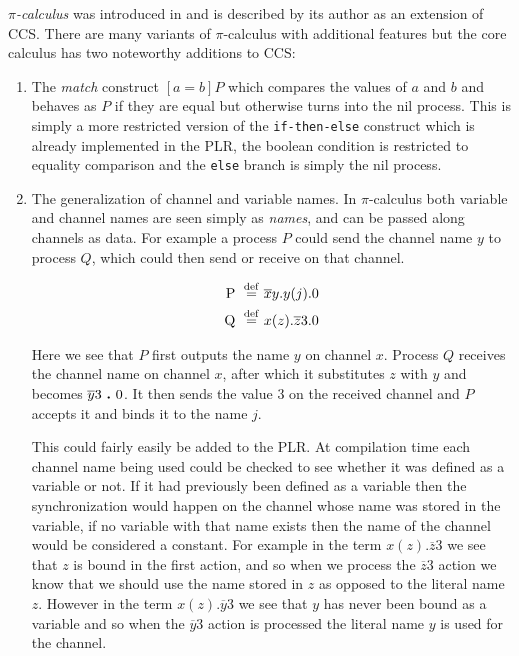 	\textit{$\pi$-calculus} was introduced in \cite{Milner89acalculus} and is 
	described by its author as an extension of CCS. There are many variants of 
	$\pi$-calculus with additional features but the core calculus has two 
	noteworthy additions to CCS:
	
	\begin{enumerate}
		\item The \textit{match} construct $[a = b] P$ which compares the values 
		of $a$ and $b$ and behaves as $P$ if they are equal but otherwise turns 
		into the nil process. This is simply a more restricted version of the 
		\texttt{if-then-else} construct which is already implemented in the PLR, 
		the 	boolean condition is restricted to equality comparison and the 
		\texttt{else} branch is simply the nil process. 
		
		\item The generalization of channel and variable names. In $\pi$-calculus 
		both variable and channel names are seen simply as \textit{names}, and can 
		be passed along channels as data. For example a process $P$ could send the 
		channel name $y$ to process $Q$, which could then send or receive on that 
		channel.
		
	  \begin{align*}
			\mathrm{P} \ \stackrel{\mathrm{def}}{=}\  & \overline{x}y . y(j) . 0\\
			\mathrm{Q} \ \stackrel{\mathrm{def}}{=}\  & x(z) . \overline{z}3 . 0\\
		\end{align*} 
		
		Here we see that $P$ first outputs the name $y$ on channel $x$. Process 
		$Q$ receives the channel name on channel $x$, after which it substitutes
		$z$ with $y$ and becomes $\overline{y}3 \ \textbf{.}\  0$. It then sends the value
		3 on the received channel and $P$ accepts it and binds it to the name $j$.
		
		This could fairly easily be added to the PLR. At compilation time each 
		channel name being used could be checked to see whether it was defined as 
		a variable or not. If it had previously been defined as a variable then 
		the synchronization would happen on the channel whose name was stored in 
		the variable, if no variable with that name exists then the name of the 
		channel would be considered a constant. For example in the term $x(z) . 
		\overline{z}3$ we see that $z$ is bound in the first action, and so when 
		we process the $\overline{z}3$ action we know that we should use the name
		stored in $z$ as opposed to the literal name $z$. However in the term 
		$x(z) . \overline{y}3$ we see that $y$ has never been bound as a variable 
		and so when the $\overline{y}3$ action is processed the literal name $y$ 
		is used for the channel.
		
	\end{enumerate}
	
